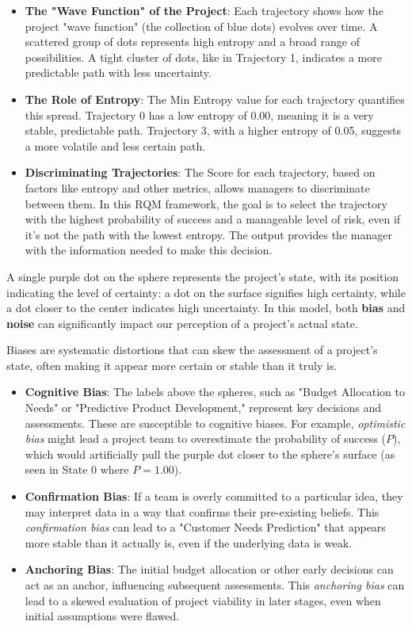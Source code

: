 \documentclass{article}
\begin{document}
\begin{itemize}
    \item \textbf{The "Wave Function" of the Project}: Each trajectory shows how the project "wave function" (the collection of blue dots) evolves over time. A scattered group of dots represents high entropy and a broad range of possibilities. A tight cluster of dots, like in Trajectory 1, indicates a more predictable path with less uncertainty.

    \item \textbf{The Role of Entropy}: The Min Entropy value for each trajectory quantifies this spread. Trajectory 0 has a low entropy of 0.00, meaning it is a very stable, predictable path. Trajectory 3, with a higher entropy of 0.05, suggests a more volatile and less certain path.

    \item \textbf{Discriminating Trajectories}: The Score for each trajectory, based on factors like entropy and other metrics, allows managers to discriminate between them. In this RQM framework, the goal is to select the trajectory with the highest probability of success and a manageable level of risk, even if it's not the path with the lowest entropy. The output provides the manager with the information needed to make this decision.
\end{itemize}

A single purple dot on the sphere represents the project's state, with its position indicating the level of certainty: a dot on the surface signifies high certainty, while a dot closer to the center indicates high uncertainty. In this model, both \textbf{bias} and \textbf{noise} can significantly impact our perception of a project's actual state.

Biases are systematic distortions that can skew the assessment of a project's state, often making it appear more certain or stable than it truly is.

\begin{itemize}
    \item \textbf{Cognitive Bias}: The labels above the spheres, such as "Budget Allocation to Needs" or "Predictive Product Development," represent key decisions and assessments. These are susceptible to cognitive biases. For example, \textit{optimistic bias} might lead a project team to overestimate the probability of success ($P$), which would artificially pull the purple dot closer to the sphere's surface (as seen in State 0 where $P=1.00$).
    \item \textbf{Confirmation Bias}: If a team is overly committed to a particular idea, they may interpret data in a way that confirms their pre-existing beliefs. This \textit{confirmation bias} can lead to a "Customer Needs Prediction" that appears more stable than it actually is, even if the underlying data is weak.
    \item \textbf{Anchoring Bias}: The initial budget allocation or other early decisions can act as an anchor, influencing subsequent assessments. This \textit{anchoring bias} can lead to a skewed evaluation of project viability in later stages, even when initial assumptions were flawed.
\end{itemize}
\end{document}
